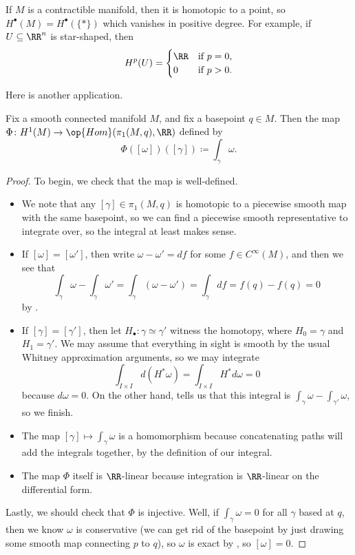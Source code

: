 \documentclass[../notes.tex]{subfiles}
\begin{document}
\begin{example}
	If $M$ is a contractible manifold, then it is homotopic to a point, so $H^\bullet(M)=H^\bullet(\{*\})$ which vanishes in positive degree. For example, if $U\subseteq\RR^n$ is star-shaped, then
	\[H^p(U)=\begin{cases}
		\RR & \text{if }p=0, \\
		0 & \text{if }p>0.
	\end{cases}\]
\end{example}
Here is another application.
\begin{proposition} \label{prop:pi1-and-h1}
	Fix a smooth connected manifold $M$, and fix a basepoint $q\in M$. Then the map $\Phi\colon H^1(M)\to\op{Hom}(\pi_1(M,q),\RR)$ defined by
	\[\Phi([\omega])([\gamma])\coloneqq\int_\gamma\omega.\]
\end{proposition}
\begin{proof}
	To begin, we check that the map is well-defined.
	\begin{itemize}
		\item We note that any $[\gamma]\in\pi_1(M,q)$ is homotopic to a piecewise smooth map with the same basepoint, so we can find a piecewise smooth representative to integrate over, so the integral at least makes sense.
		\item If $[\omega]=[\omega']$, then write $\omega-\omega'=df$ for some $f\in C^\infty(M)$, and then we see that
		\[\int_\gamma\omega-\int_\gamma\omega'=\int_\gamma(\omega-\omega')=\int_\gamma df=f(q)-f(q)=0\]
		by . 
		\item If $[\gamma]=[\gamma']$, then let $H_\bullet\colon\gamma\simeq\gamma'$ witness the homotopy, where $H_0=\gamma$ and $H_1=\gamma'$. We may assume that everything in sight is smooth by the usual Whitney approximation arguments, so we may integrate
		\[\int_{I\times I}d(H^*\omega)=\int_{I\times I}H^*d\omega=0\]
		because $d\omega=0$. On the other hand,  tells us that this integral is $\int_{\gamma}\omega-\int_{\gamma'}\omega$, so we finish.
		\item The map $[\gamma]\mapsto\int_\gamma\omega$ is a homomorphism because concatenating paths will add the integrals together, by the definition of our integral.
		\item The map $\Phi$ itself is $\RR$-linear because integration is $\RR$-linear on the differential form.
	\end{itemize}
	Lastly, we should check that $\Phi$ is injective. Well, if $\int_\gamma\omega=0$ for all $\gamma$ based at $q$, then we know $\omega$ is conservative (we can get rid of the basepoint by just drawing some smooth map connecting $p$ to $q$), so $\omega$ is exact by , so $[\omega]=0$.
\end{proof}
\end{document}
